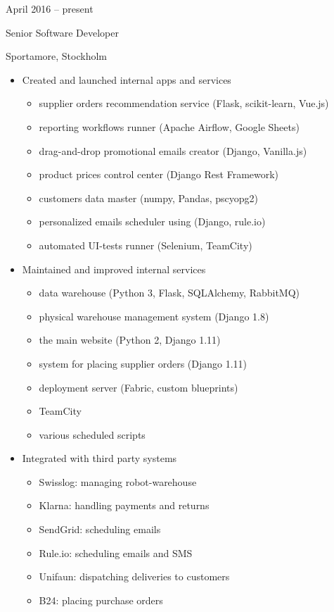 \documentclass[a4paper,10pt]{article}
\newlength{\cvcolumngapwidth}
\newlength{\cvleftcolumnwidth}
\newlength{\cvrightcolumnwidth}
\newcommand{\cvtitlestyle}[1]{{\large\cvtitlefont\textcolor{cvtitlecolor}{#1}}}
\newcommand{\cvdurationstyle}[1]{{\small\cvdurationfont\textcolor{cvdurationcolor}{#1}}}
\newlength{\cvafteritemskipamount}
\newlength{\cvaftertitleskipamount}
\newlength{\cvparskip}
\newcommand{\cvitem}[2]{
    \begin{minipage}[t]{\cvleftcolumnwidth}
        \raggedleft #1
    \end{minipage}%
    \hspace{\cvcolumngapwidth}%
    \begin{minipage}[t]{\cvrightcolumnwidth}
        \setlength{\parskip}{\cvparskip} #2
    \end{minipage}

    \vspace{\cvafteritemskipamount}
}
\newcommand{\cvtitle}[1]{
    \cvtitlestyle{#1}

    \vspace{\cvaftertitleskipamount}
    \vspace{-\cvparskip}
}
\begin{document}
\cvitem{
    \cvdurationstyle{April 2016 -- present}
}{
    \cvtitle{Senior Software Developer}

    Sportamore, Stockholm

    \begin{itemize}[leftmargin=*]
        \item Created and launched internal apps and services
	    \begin{itemize}[leftmargin=*]
		  \item supplier orders recommendation service (Flask, scikit-learn, Vue.js)
		  \item reporting workflows runner (Apache Airflow, Google Sheets)
		  \item drag-and-drop promotional emails creator (Django, Vanilla.js)
		  \item product prices control center (Django Rest Framework)
		  \item customers data master (numpy, Pandas, pscyopg2)
		  \item personalized emails scheduler using (Django, rule.io)
		  \item automated UI-tests runner (Selenium, TeamCity)
	    \end{itemize}
    \end{itemize}

    \begin{itemize}[leftmargin=*]
        \item Maintained and improved internal services 
	    \begin{itemize}[leftmargin=*]
		  \item data warehouse (Python 3, Flask, SQLAlchemy, RabbitMQ)
		  \item physical warehouse management system (Django 1.8)
		  \item the main website (Python 2, Django 1.11)
		  \item system for placing supplier orders (Django 1.11)
		  \item deployment server (Fabric, custom blueprints)
		  \item TeamCity
		  \item various scheduled scripts
	    \end{itemize}
    \end{itemize}

    \begin{itemize}[leftmargin=*]
        \item Integrated with third party systems
	    \begin{itemize}[leftmargin=*]
		  \item Swisslog: managing robot-warehouse
		  \item Klarna: handling payments and returns
		  \item SendGrid: scheduling emails
		  \item Rule.io: scheduling emails and SMS
		  \item Unifaun: dispatching deliveries to customers
		  \item B24: placing purchase orders
	    \end{itemize}
    \end{itemize}

}
\end{document}
